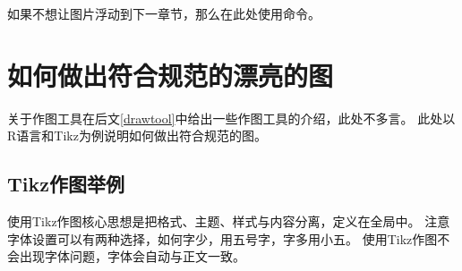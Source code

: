 \begin{figure}[!h]
\begin{sideways}
\begin{minipage}{\textheight}
    \end{minipage}
  \end{sideways}
\end{figure}

\clearpage

如果不想让图片浮动到下一章节，那么在此处使用命令。

\section{如何做出符合规范的漂亮的图}
关于作图工具在后文\ref{drawtool}中给出一些作图工具的介绍，此处不多言。
此处以R语言和Tikz为例说明如何做出符合规范的图。

\subsection{Tikz作图举例}
使用Tikz作图核心思想是把格式、主题、样式与内容分离，定义在全局中。
注意字体设置可以有两种选择，如何字少，用五号字，字多用小五。
使用Tikz作图不会出现字体问题，字体会自动与正文一致。

